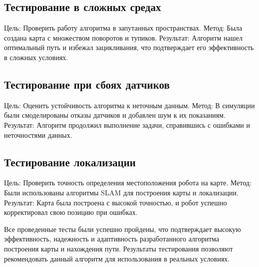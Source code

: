 \subsection{Тестирование в сложных средах}
Цель: Проверить работу алгоритма в запутанных пространствах.
Метод: Была создана карта с множеством поворотов и тупиков.
Результат: Алгоритм нашел оптимальный путь и избежал зацикливания, что подтверждает его эффективность в сложных условиях.

\subsection{Тестирование при сбоях датчиков}
Цель: Оценить устойчивость алгоритма к неточным данным.
Метод: В симуляции были смоделированы отказы датчиков и добавлен шум к их показаниям.
Результат: Алгоритм продолжил выполнение задачи, справившись с ошибками и неточностями данных.

\subsection{Тестирование локализации}
Цель: Проверить точность определения местоположения робота на карте.
Метод: Были использованы алгоритмы SLAM для построения карты и локализации.
Результат: Карта была построена с высокой точностью, и робот успешно корректировал свою позицию при ошибках.

Все проведенные тесты были успешно пройдены, что подтверждает высокую эффективность, надежность и адаптивность разработанного алгоритма построения карты и нахождения пути. Результаты тестирования позволяют рекомендовать данный алгоритм для использования в реальных условиях.
